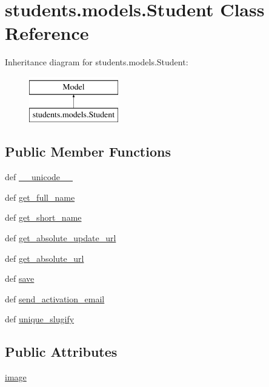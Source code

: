\hypertarget{classstudents_1_1models_1_1_student}{\section{students.\-models.\-Student Class Reference}
\label{classstudents_1_1models_1_1_student}
}
Inheritance diagram for students.\-models.\-Student\-:\begin{figure}[H]
\begin{center}
\leavevmode
\includegraphics[height=2.000000cm]{classstudents_1_1models_1_1_student}
\end{center}
\end{figure}
\subsection*{Public Member Functions}
\begin{DoxyCompactItemize}
\item 
def \hyperlink{classstudents_1_1models_1_1_student_a9d4928c942577b10f9d2ba8a99c21fee}{\-\_\-\-\_\-unicode\-\_\-\-\_\-}
\item 
def \hyperlink{classstudents_1_1models_1_1_student_acad8d7a62069a546d1e3a5f96a7fd971}{get\-\_\-full\-\_\-name}
\item 
def \hyperlink{classstudents_1_1models_1_1_student_adb4699e44c6376397ce441fc8694840e}{get\-\_\-short\-\_\-name}
\item 
def \hyperlink{classstudents_1_1models_1_1_student_a435641b741a8020d3abb4a356867fbb0}{get\-\_\-absolute\-\_\-update\-\_\-url}
\item 
def \hyperlink{classstudents_1_1models_1_1_student_ae9125f2c920f8b915e714d58bade580d}{get\-\_\-absolute\-\_\-url}
\item 
def \hyperlink{classstudents_1_1models_1_1_student_a7d9cc5b28b8b29fafd91020c3ab7bb96}{save}
\item 
def \hyperlink{classstudents_1_1models_1_1_student_adb3818c664b585eecc100caf80d3f529}{send\-\_\-activation\-\_\-email}
\item 
def \hyperlink{classstudents_1_1models_1_1_student_ab1ff0197cbfbdbfac52b54a9bc51e592}{unique\-\_\-slugify}
\end{DoxyCompactItemize}
\subsection*{Public Attributes}
\begin{DoxyCompactItemize}
\item 
\hyperlink{classstudents_1_1models_1_1_student_a6f81eac38fb0a6074eb663b3cab8055e}{image}
\end{DoxyCompactItemize}
